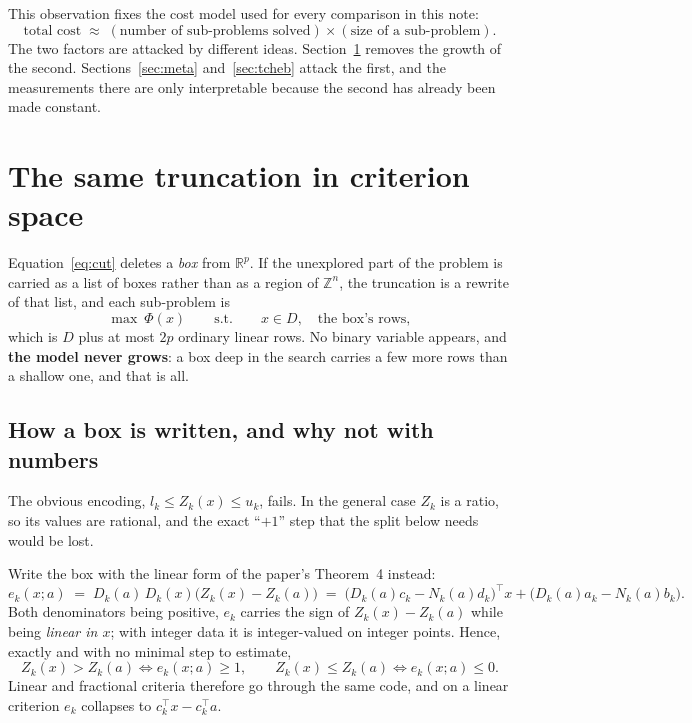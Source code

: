 \documentclass[11pt,a4paper]{article}
\newcommand{\Z}{Z}
\newcommand{\Dset}{D}
\newcommand{\R}{\mathbb{R}}
\newcommand{\Zint}{\mathbb{Z}}
\begin{document}
This observation fixes the cost model used for every comparison in this note:
\begin{equation}\label{eq:cost}
  \text{total cost} \;\approx\; (\text{number of sub-problems solved})
  \times (\text{size of a sub-problem}).
\end{equation}
The two factors are attacked by different ideas. Section~\ref{sec:box} removes
the growth of the second. Sections~\ref{sec:meta} and~\ref{sec:tcheb} attack
the first, and the measurements there are only interpretable because the second
has already been made constant.

\section{The same truncation in criterion space}\label{sec:box}

Equation~\eqref{eq:cut} deletes a \emph{box} from $\R^p$. If the unexplored
part of the problem is carried as a list of boxes rather than as a region of
$\Zint^n$, the truncation is a rewrite of that list, and each sub-problem is
\begin{equation}\label{eq:sub}
  \max \ \Phi(x) \qquad \text{s.t.} \qquad x \in \Dset, \quad \text{the box's rows},
\end{equation}
which is $\Dset$ plus at most $2p$ ordinary linear rows. No binary variable
appears, and \textbf{the model never grows}: a box deep in the search carries a
few more rows than a shallow one, and that is all.

\subsection{How a box is written, and why not with numbers}

The obvious encoding, $l_k \leqslant \Z_k(x) \leqslant u_k$, fails. In the
general case $\Z_k$ is a ratio, so its values are rational, and the exact
``$+1$'' step that the split below needs would be lost.

Write the box with the linear form of the paper's Theorem~4 instead:
\begin{equation}\label{eq:e}
  e_k(x;a) \;=\; D_k(a)\, D_k(x) \bigl( \Z_k(x) - \Z_k(a) \bigr)
  \;=\; \bigl(D_k(a) c_k - N_k(a) d_k\bigr)^{\top} x
      + \bigl(D_k(a) a_k - N_k(a) b_k\bigr).
\end{equation}
Both denominators being positive, $e_k$ carries the sign of
$\Z_k(x) - \Z_k(a)$ while being \emph{linear in $x$}; with integer data it is
integer-valued on integer points. Hence, exactly and with no minimal step to
estimate,
\begin{equation}\label{eq:exact}
  \Z_k(x) > \Z_k(a) \iff e_k(x;a) \geqslant 1,
  \qquad
  \Z_k(x) \leqslant \Z_k(a) \iff e_k(x;a) \leqslant 0 .
\end{equation}
Linear and fractional criteria therefore go through the same code, and on a
linear criterion $e_k$ collapses to $c_k^{\top}x - c_k^{\top}a$.
\end{document}
